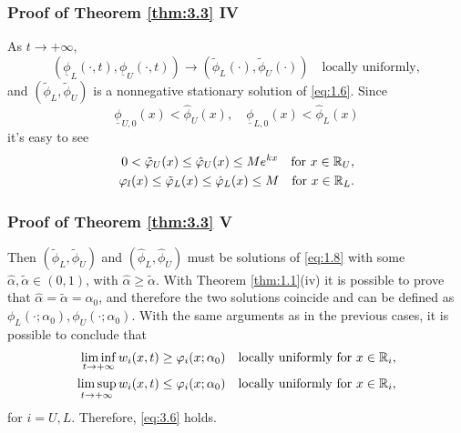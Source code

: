 
\begin{frame}
    \frametitle{Proof of Theorem \ref{thm:3.3} IV}
    \begin{proofc}
        As \(t \to +\infty\),
        \[
            (\underline{\phi}_L(\cdot, t), \underline{\phi}_U(\cdot, t)) \to (\tilde{\phi}_L(\cdot), \tilde{\phi}_U(\cdot)) \quad \text{locally uniformly},
        \]
        and \((\tilde{\phi}_L, \tilde{\phi}_U)\) is a nonnegative stationary solution of \eqref{eq:1.6}. Since
        \[
            \underline{\phi}_{U,0}(x) < \hat{\phi}_U(x), \quad \underline{\phi}_{L,0}(x) < \hat{\phi}_L(x)
        \]
        it's easy to see
        \begin{align*}
            0 < \tilde{\varphi}_U(x) \leq \hat{\varphi}_U(x)  \leq M e^{kx} \quad \text{for } x \in \mathbb{R}_U, \\
            \varphi_l(x) \leq \tilde{\varphi}_L(x) \leq \hat{\varphi}_L(x) \leq M \quad \text{for } x \in \mathbb{R}_L.
        \end{align*}
    \end{proofc}
\end{frame}


\begin{frame}
    \frametitle{Proof of Theorem \ref{thm:3.3} V}
    \begin{proofe}
        Then \((\tilde{\phi}_L, \tilde{\phi}_U)\) and \((\hat{\phi}_L, \hat{\phi}_U)\) must be solutions of \eqref{eq:1.8} with some \(\hat{\alpha}, \tilde{\alpha} \in (0,1)\), with \(\hat{\alpha} \geq \tilde{\alpha}\). With Theorem \ref{thm:1.1}(iv) it is possible to prove that \(\hat{\alpha} = \tilde{\alpha} = \alpha_0\), and therefore the two solutions coincide and can be defined as \(\phi_L(\cdot; \alpha_0), \phi_U(\cdot; \alpha_0)\).
        With the same arguments as in the previous cases, it is possible to conclude that
        \begin{align*}
            \liminf_{t \to +\infty} w_i(x, t) \geq \varphi_i(x; \alpha_0) \quad \text{locally uniformly for } x \in \mathbb{R}_i, \\
            \limsup_{t \to +\infty} w_i(x, t) \leq \varphi_i(x; \alpha_0) \quad \text{locally uniformly for } x \in \mathbb{R}_i,
        \end{align*}
        for \(i = U, L\).
        Therefore, \eqref{eq:3.6} holds.
    \end{proofe}
\end{frame}